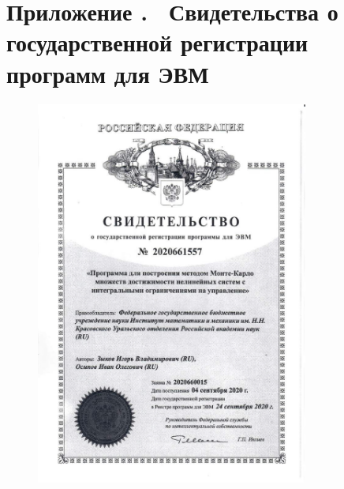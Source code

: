 \documentclass[../main.tex]{subfiles}
\begin{document}
\clearpage
{}
\section*{Приложение .  Свидетельства о государственной регистрации программ для ЭВМ}%
\label{app:B}%
\renewcommand{\theequation}{\Alph{section}.\arabic{equation}}%
\setcounter{equation}{0}
 	\begin{figure}[h]
 		\centering
 			\includegraphics[width=0.8\textwidth]{images/ZykovOsipovPatent.jpg}
 	\end{figure}
\end{document}
